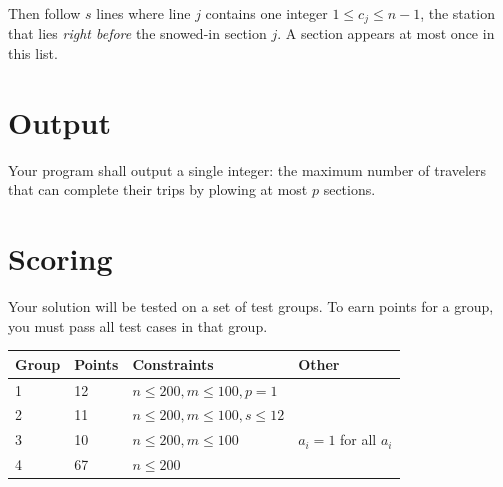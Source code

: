Then follow $s$ lines where line $j$ contains one integer $ 1 \le c_j \le n - 1$, the station that lies \emph{right before} the snowed-in section $j$.
A section appears at most once in this list.


\section*{Output}
Your program shall output a single integer: the maximum number of travelers that can complete their trips by plowing at most $p$ sections.

\section*{Scoring}
Your solution will be tested on a set of test groups. To earn points for a group, you must pass all test cases in that group.

\begin{tabular}{| l | l | l | l |}
\hline
Group & Points & Constraints & Other \\ \hline
1     & 12         & $ n \le 200, m \le 100, p = 1$ &\\ \hline
2     & 11         & $ n \le 200, m \le 100, s \le 12 $ &\\ \hline
3     & 10          & $ n \le 200, m \le 100$ & $a_i = 1$ for all $a_i$\\ \hline
4     & 67         & $ n \le 200$ &\\ \hline
\end{tabular}
